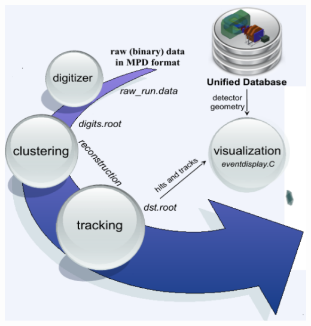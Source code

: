 \documentclass[dvipsnames] {beamer}
\begin{document}
\begin{frame}
\begin{columns}[t]
\begin{block}{\bf {}}
      \includegraphics[width=1.\linewidth]{offline_anal_v2.png}
    \end{block}
    

\end{columns}
\end{frame}
\end{document}
